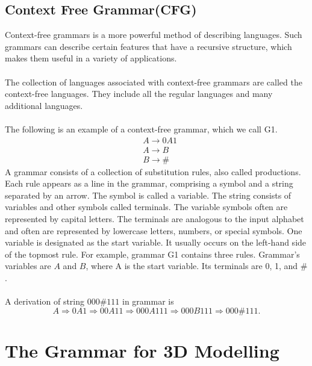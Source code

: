 \documentclass{article}
\begin{document}
\subsection{Context Free Grammar(CFG)}
Context-free grammars is a more powerful method
of describing languages. Such grammars can describe certain features that have
a recursive structure, which makes them useful in a variety of applications.\\
\\
The collection of languages associated with context-free grammars are called
the context-free languages. They include all the regular languages and many
additional languages.\\
\\
The following is an example of a context-free grammar, which we call G1.
\begin{align*}
&A \to 0A1\\
&A \to B\\
&B \to \#
\end{align*}
A grammar consists of a collection of substitution rules, also called productions.
Each rule appears as a line in the grammar, comprising a symbol and
a string separated by an arrow. The symbol is called a variable. The string
consists of variables and other symbols called terminals. The variable symbols
often are represented by capital letters. The terminals are analogous to the input
alphabet and often are represented by lowercase letters, numbers, or special
symbols. One variable is designated as the start variable. It usually occurs on
the left-hand side of the topmost rule. For example, grammar G1 contains three
rules. Grammar’s variables are $A$ and $B$, where A is the start variable. Its terminals are
0, 1, and $\#$.\\
\\
A derivation of string $000\#111$ in grammar  is
\begin{equation*}
A \Rightarrow 0A1 \Rightarrow 00A11 \Rightarrow 000A111 \Rightarrow 000B111 \Rightarrow 000\#111.
\end{equation*}

\section{The Grammar for 3D Modelling}
\end{document}

